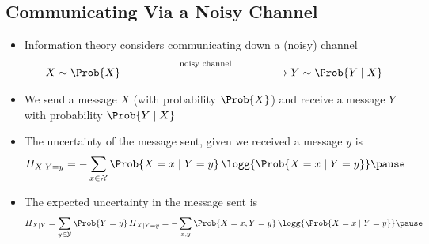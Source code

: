 \begin{slide}
\section[-1]{Communicating Via a Noisy Channel}

\begin{PauseHighLight}\small
  \begin{itemize}
  \item Information theory considers communicating down a (noisy)
    channel
    \begin{align*}
      X \sim \Prob{X}  \stackrel{\text{noisy
      channel}}{\xrightarrow{\hspace*{5cm}}} Y \sim \Prob{Y\mid X}
    \end{align*}
  \item  We send a message $X$ (with probability $\Prob{X}$) and
    receive a message $Y$ with probability $\Prob{Y\mid X}$\pause
  \item The uncertainty of the message sent, given we received a
    message $y$ is
    \begin{align*}
      H_{X|Y=y} = - \sum_{x\in\mathcal{X}} \Prob{X=x \mid Y=y} \, \logg{\Prob{X=x \mid Y=y}}\pause
    \end{align*}
  \item The expected uncertainty in the message sent is
    \begin{align*}
      H_{X|Y} = \sum_{y\in\mathcal{Y}} \Prob{Y=y} \, H_{X|Y=y}
      = - \sum_{x,y} \Prob{X=x,Y=y} \, \logg{\Prob{X=x \mid Y=y}}\pause
    \end{align*}
  \end{itemize}
\end{PauseHighLight}

\end{slide}



